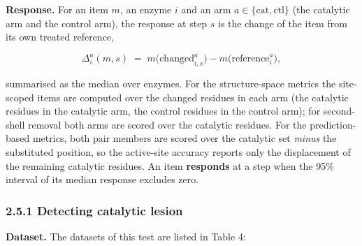 \documentclass[
  10pt,
]{article}
\DeclareRobustCommand{\_}{\textunderscore\hspace{0pt}}
\begin{document}
\textbf{Response.}
For an item \(m\),
an enzyme \(i\) and
an arm
\(a \in \{\mathrm{cat}, \mathrm{ctl}\}\)
(the catalytic arm
and the control
arm), the response
at step \(s\) is the
change of the item
from its own treated
reference,

\begin{equation*}\Delta^{a}_{i}(m, s) \;=\; m\big(\text{changed}^{a}_{i,s}\big) - m\big(\text{reference}^{a}_{i}\big) , \tag{18}\end{equation*}

summarised as the
median over enzymes.
For the
structure-space
metrics the
site-scoped items
are computed over
the changed residues
in each arm (the
catalytic residues
in the catalytic
arm, the control
residues in the
control arm); for
second-shell removal
both arms are scored
over the catalytic
residues. For the
prediction-based
metrics, both pair
members are scored
over the catalytic
set \emph{minus} the
substituted
position, so the
active-site accuracy
reports only the
displacement of the
remaining catalytic
residues. An item
\textbf{responds} at
a step when the 95\%
interval of its
median response
excludes zero.

\subsubsection{2.5.1
Detecting catalytic
lesion}

\textbf{Dataset.}
The datasets of this
test are listed in
Table 4:
\end{document}

